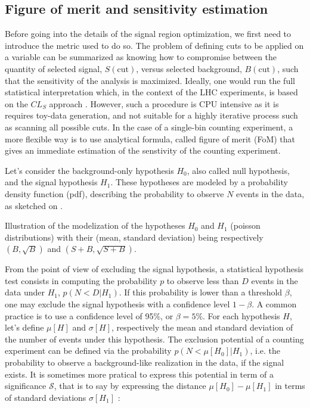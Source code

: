     \subsection{Figure of merit and sensitivity estimation \label{sec:FoMdiscussion}}

    Before going into the details of the signal region optimization, we first need to
    introduce the metric used to do so. The problem of defining cuts to be applied on a
    variable can be summarized as knowing how to compromise between the quantity of
    selected signal, $S(\text{cut})$, versus selected background, $B(\text{cut})$, such
    that the sensitivity of the analysis is maximized. Ideally, one would run the full
    statistical interpretation which, in the context of the LHC experiments, is based
    on the $CL_S$ approach \cite{CLs}. However, such a procedure is CPU intensive as it is
    requires toy-data generation, and not suitable for a highly iterative process such
    as scanning all possible cuts. In the case of a single-bin counting experiment, a more
    flexible way is to use analytical formula, called figure of merit (FoM) that gives an
    immediate estimation of the senstivity of the counting experiment.

    Let's consider the background-only hypothesis $H_0$, also called null hypothesis,
    and the signal hypothesis $H_1$. These hypotheses are modeled by a probability density
    function (pdf), describing the probability to observe $N$ events in the data, as
    sketched on .

                 {Illustration of the modelization of the hypotheses $H_0$ and $H_1$
                 (poisson distributions) with their (mean, standard deviation) being respectively
                 $(B,\sqrt{B})$ and $(S+B,\sqrt{S+B})$.}

    From the point of view of excluding the signal hypothesis, a statistical hypothesis
    test consists in computing the probability $p$ to observe less than $D$ events in the
    data under $H_1$, $p(N < D|H_1)$. If this probability is lower than a threshold
    $\beta$, one may exclude the signal hypothesis with a confidence level $1-\beta$. A
    common practice is to use a confidence level of 95\%, or $\beta = 5\%$. For each
    hypothesis $H$, let's define $\mu[H]$ and $\sigma[H]$, respectively the mean and
    standard deviation of the number of events under this hypothesis.
    The exclusion potential of a counting experiment can be defined via the probability $p(N < \mu[H_0]|H_1)$,
    i.e. the probability to observe a background-like realization in the data, if the
    signal exists. It is sometimes more pratical to express this potential in term of a
    significance $\mathcal{S}$, that is to say by expressing the distance $\mu[H_0] -
    \mu[H_1]$ in terms of standard deviations $\sigma[H_1]$ :

